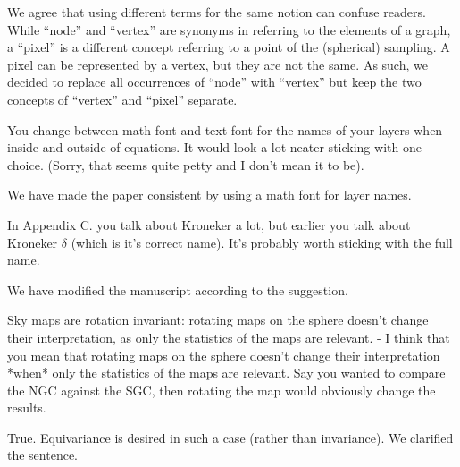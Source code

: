 \documentclass[12pt,a4paper]{article}
\newcommand{\nati}[1]{{\color[rgb]{.1,.6,.1}{NP: #1}}}
\newcommand{\mdeff}[1]{{\color[rgb]{.1,.6,.1}{MD: #1}}}
\newcommand{\TK}[1]{{\color{red}{TK: #1}}}
\newcommand{\1}{\b{1}}              %
\newcommand{\0}{\b{0}}              %
\begin{document}
We agree that using different terms for the same notion can confuse readers.
While ``node'' and ``vertex'' are synonyms in referring to the elements of a graph, a ``pixel'' is a different concept referring to a point of the (spherical) sampling.
A pixel can be represented by a vertex, but they are not the same.
As such, we decided to replace all occurrences of ``node'' with ``vertex'' but keep the two concepts of ``vertex'' and ``pixel'' separate.


\begin{mdframed}[style=comment]
You change between math font and text font for the names of your layers when inside and outside of equations. It would look a lot neater sticking with one choice. (Sorry, that seems quite petty and I don't mean it to be).
\end{mdframed}

We have made the paper consistent by using a math font for layer names.

\begin{mdframed}[style=comment]
In Appendix C. you talk about Kroneker a lot, but earlier you talk about Kroneker $\delta$ (which is it's correct name). It's probably worth sticking with the full name.
\end{mdframed}

We have modified the manuscript according to the suggestion.

\begin{mdframed}[style=comment]
Sky maps are rotation invariant: rotating maps on the sphere doesn’t change their interpretation, as only the statistics of the maps are relevant.
- I think that you mean that rotating maps on the sphere doesn't change their interpretation *when* only the statistics of the maps are relevant. Say you wanted to compare the NGC against the SGC, then rotating the map would obviously change the results.
\end{mdframed}

True.
Equivariance is desired in such a case (rather than invariance).
We clarified the sentence.
\end{document}
